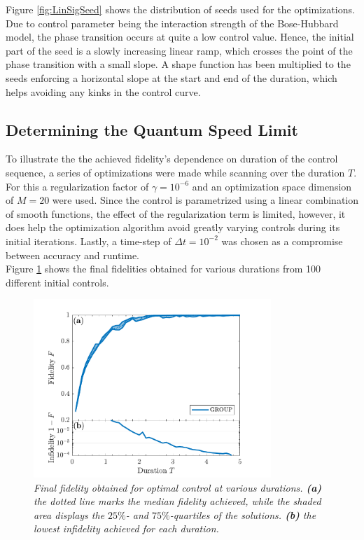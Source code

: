 Figure \ref{fig:LinSigSeed} shows the distribution of seeds used for the optimizations. Due to control parameter being the interaction strength of the Bose-Hubbard model, the phase transition occurs at quite a low control value. Hence, the initial part of the seed is a slowly increasing linear ramp, which crosses the point of the phase transition with a small slope. A shape function has been multiplied to the seeds enforcing a horizontal slope at the start and end of the duration, which helps avoiding any kinks in the control curve.


\subsection{Determining the Quantum Speed Limit}
To illustrate the the achieved fidelity's dependence on duration of the control sequence, a series of optimizations were made while scanning over the duration $T$. For this a regularization factor of $\gamma = 10^{-6}$ and an optimization space dimension of $M = 20$ were used. Since the control is parametrized using a linear combination of smooth functions, the effect of the regularization term is limited, however, it does help the optimization algorithm avoid greatly varying controls during its initial iterations. Lastly, a time-step of $\Delta t = 10^{-2}$ was chosen as a compromise between accuracy and runtime.\\
Figure \ref{fig:FidelityDuration5} shows the final fidelities obtained for various durations from 100 different initial controls.
\begin{figure}[h!]
    \centering
    \includegraphics[width=0.8\textwidth]{Figures/5part/FidelityDuration.pdf}
    \caption{\textit{Final fidelity obtained for optimal control at various durations. \textbf{(a)} the dotted line marks the median fidelity achieved, while the shaded area displays the $25\%$- and $75\%$-quartiles of the solutions. \textbf{(b)} the lowest infidelity achieved for each duration. }}
    \label{fig:FidelityDuration5}
\end{figure}

